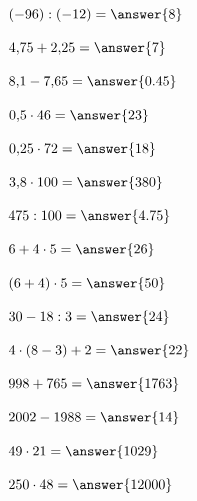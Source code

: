 \documentclass{ximera}
\begin{document}
\begin{oefening}{\oefB\ESS}
\begin{question} \((-96):(-12)=\answer{8}\) \end{question}

\begin{question} \(4{,}75+2{,}25=\answer{7}\) \end{question}

\begin{question} \(8{,}1-7{,}65=\answer{0.45}\) \end{question}

\begin{question} \(0{,}5\cdot46=\answer{23}\) \end{question}

\begin{question} \(0{,}25\cdot72=\answer{18}\) \end{question}

\begin{question} \(3{,}8\cdot100=\answer{380}\) \end{question}

\begin{question} \(475:100=\answer{4.75}\) \end{question}

\begin{question} \(6+4\cdot5=\answer{26}\) \end{question}

\begin{question} \((6+4)\cdot5=\answer{50}\) \end{question}

\begin{question} \(30-18:3=\answer{24}\) \end{question}

\begin{question} \(4\cdot(8-3)+2=\answer{22}\) \end{question}

\begin{question} \(998+765=\answer{1763}\) \end{question}

\begin{question} \(2002-1988=\answer{14}\) \end{question}

\begin{question} \(49\cdot21=\answer{1029}\) \end{question}

\begin{question} \(250\cdot48=\answer{12000}\) \end{question}


\end{oefening}
\end{document}
